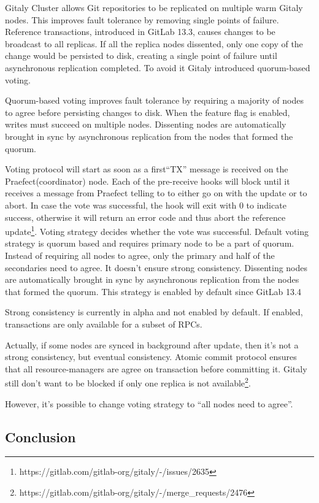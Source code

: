 \documentclass[sigplan, screen, nonacm, 11pt]{acmart}
\begin{document}
Gitaly Cluster allows Git repositories to be replicated on multiple warm Gitaly nodes.
This improves fault tolerance by removing single points of failure.
Reference transactions, introduced in GitLab 13.3,
causes changes to be broadcast to all replicas.
If all the replica nodes dissented, only one copy of the change would be persisted to disk,
creating a single point of failure until asynchronous replication completed.
To avoid it Gitaly introduced quorum-based voting.

Quorum-based voting improves fault tolerance by requiring a majority of nodes to agree before persisting changes to disk.
When the feature flag is enabled, writes must succeed on multiple nodes.
Dissenting nodes are automatically brought in sync by asynchronous replication from the nodes that formed the quorum.

Voting protocol will start as soon as a first``TX'' message is received on the Praefect(coordinator) node.
Each of the pre-receive hooks will block until it receives a message from Praefect telling to to either go on with the update or to abort.
In case the vote was successful, the hook will exit with 0 to indicate success, otherwise it will return an error code and thus abort the reference update\footnote{https://gitlab.com/gitlab-org/gitaly/-/issues/2635}.
Voting strategy decides whether the vote was successful.
Default voting strategy is quorum based and requires primary node to be a part of quorum.
Instead of requiring all nodes to agree, only the primary and half of the secondaries need to agree.
It doesn't ensure strong consistency.
Dissenting nodes are automatically brought in sync by asynchronous replication from the nodes that formed the quorum.
This strategy is enabled by default since GitLab 13.4

Strong consistency is currently in alpha and not enabled by default.
If enabled, transactions are only available for a subset of RPCs.

Actually, if some nodes are synced in background after update, then it's not a strong consistency, but eventual consistency.
Atomic commit protocol ensures that all resource-managers are agree on transaction before committing it.
Gitaly still don't want to be blocked if only one replica is not available\footnote{https://gitlab.com/gitlab-org/gitaly/-/merge\_requests/2476}.

However, it's possible to change voting strategy to ``all nodes need to agree''.

\subsection{Conclusion}
\end{document}
